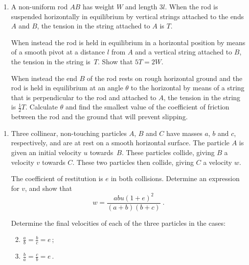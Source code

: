 \documentclass[a4, 11pt]{report}
\newlength{\qspace}
\newcounter{qnumber}
\newenvironment{question}%
 {\vspace{\qspace}
  \begin{enumerate}[\bfseries 1\quad][10]%
    \setcounter{enumi}{\value{qnumber}}%
    \item%
 }
{
  \end{enumerate}
  \filbreak
  \stepcounter{qnumber}
 }
\newenvironment{questionparts}[1][1]%
 {
  \begin{enumerate}[\bfseries (i)]%
    \setcounter{enumii}{#1}
    \addtocounter{enumii}{-1}
    \setlength{\itemsep}{5mm}
    \setlength{\parskip}{8pt}
 }
 {
  \end{enumerate}
 }
\def\l{\left(}
\def\r{\right)}
\begin{document}
	
\begin{question}
A non-uniform rod $AB$ has weight $W$ and  length $3l$. 
When the rod  is suspended horizontally in equilibrium by  vertical 
strings attached to the ends $A$ and $B$, 
the tension in the string 
attached to $A$ is $T$.



When  instead the rod is held
in equilibrium in a horizontal position by means of  a smooth pivot at a distance $l$ from $A$
and a vertical 
string attached to  $B$, the tension in the string  is~$T$. 
Show that $5T = 2W$.

When instead the end $B$ of the rod
rests on rough horizontal ground and the rod is held in equilibrium
at an angle $\theta$ to the horizontal
by means of    
a string that is perpendicular to the rod and  attached to $A$, 
the tension in the string is $\frac12 T$. 
Calculate $\theta$ and find the smallest value of 
the 
coefficient of friction between the rod and the ground that will prevent slipping.
	\end{question}
	
\begin{question}	
Three collinear, non-touching particles $A$, $B$ and $C$ have masses $a$, $b$ and $c$,
respectively, and  are 
at rest on a smooth horizontal surface. 
The particle $A$ is given an initial velocity $u$ towards~$B$. 
These particles collide, giving $B$ a velocity $v$ towards $C$. 
These two particles then collide, giving $C$ a velocity $w$. 

The coefficient of 
restitution is $e$ in both collisions. 
Determine an expression for $v$, and show that 
\[
\displaystyle w = \frac {abu \l 1+e \r^2}{\l a + b \r \l b+c \r}\;.
\]

Determine the final velocities of each of the three particles in the cases:
\begin{questionparts}
\item $\displaystyle \frac ab  = \frac bc = e\,$;
\item $\displaystyle \frac ba  = \frac cb  = e\,$.

\end{questionparts}
\end{question}

\end{document}
